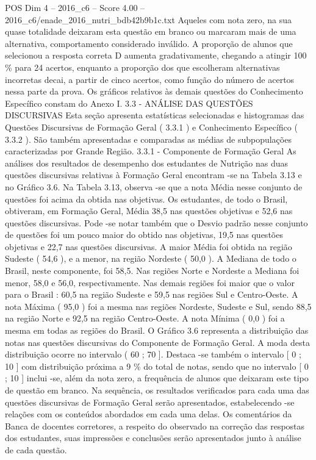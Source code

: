 \begin{textsample}{POS Dim 4 – 2016\_c6 – Score 4.00 – 2016\_c6/enade\_2016\_nutri\_bdb42b9b1c.txt}
Aqueles com nota zero, na sua quase totalidade deixaram esta questão em branco ou marcaram mais de uma alternativa, comportamento considerado inválido.
A proporção de alunos que selecionou a resposta correta D aumenta gradativamente, chegando a atingir 100 \% para 24 acertos, enquanto a proporção dos que escolheram alternativas incorretas decai, a partir de cinco acertos, como função do número de acertos nessa parte da prova.
Os gráficos relativos às demais questões do Conhecimento Específico constam do Anexo I. 3.3 - ANÁLISE DAS QUESTÕES DISCURSIVAS Esta seção apresenta estatísticas selecionadas e histogramas das Questões Discursivas de Formação Geral ( 3.3.1 ) e Conhecimento Específico ( 3.3.2 ).
São também apresentadas e comparadas as médias de subpopulações caracterizadas por Grande Região. 3.3.1 - Componente de Formação Geral As análises dos resultados de desempenho dos estudantes de Nutrição nas duas questões discursivas relativas à Formação Geral encontram -se na Tabela 3.13 e no Gráfico 3.6.
Na Tabela 3.13, observa -se que a nota Média nesse conjunto de questões foi acima da obtida nas objetivas.
Os estudantes, de todo o Brasil, obtiveram, em Formação Geral, Média 38,5 nas questões objetivas e 52,6 nas questões discursivas.
Pode -se notar também que o Desvio padrão nesse conjunto de questões foi um pouco maior do obtido nas objetivas, 19,5 nas questões objetivas e 22,7 nas questões discursivas.
A maior Média foi obtida na região Sudeste ( 54,6 ), e a menor, na região Nordeste ( 50,0 ).
A Mediana de todo o Brasil, neste componente, foi 58,5.
Nas regiões Norte e Nordeste a Mediana foi menor, 58,0 e 56,0, respectivamente.
Nas demais regiões foi maior que o valor para o Brasil : 60,5 na região Sudeste e 59,5 nas regiões Sul e Centro-Oeste.
A nota Máxima ( 95,0 ) foi a mesma nas regiões Nordeste, Sudeste e Sul, sendo 88,5 na região Norte e 92,5 na região Centro-Oeste.
A nota Mínima ( 0,0 ) foi a mesma em todas as regiões do Brasil.
O Gráfico 3.6 representa a distribuição das notas nas questões discursivas do Componente de Formação Geral.
A moda desta distribuição ocorre no intervalo ( 60 ; 70 ].
Destaca -se também o intervalo [ 0 ; 10 ] com distribuição próxima a 9 \% do total de notas, sendo que no intervalo [ 0 ; 10 ] inclui -se, além da nota zero, a frequência de alunos que deixaram este tipo de questão em branco.
Na sequência, os resultados verificados para cada uma das questões discursivas de Formação Geral serão apresentados, estabelecendo -se relações com os conteúdos abordados em cada uma delas.
Os comentários da Banca de docentes corretores, a respeito do observado na correção das respostas dos estudantes, suas impressões e conclusões serão apresentados junto à análise de cada questão.

\end{textsample}
